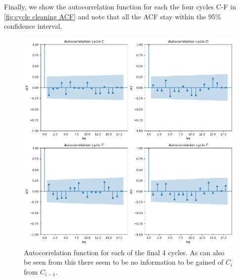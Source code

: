 \documentclass[../Thesis.tex]{subfiles}
\begin{document}
Finally, we show the autocorrelation function for each the four cycles C-F in \autoref{fig:cycle cleaning ACF} and note that all the ACF stay within the 95\% confidence interval.

\begin{figure}[h]
    \centering
    \includegraphics[width=0.8\linewidth]{figures/Multiple cycles data/Cleaning Autocorrelation.png}
    \caption{Autocorrelation function for each of the final 4 cycles. As can also be seen from this there seem to be no information to be gained of $C_i$ from $C_{i-1}$.}
    \label{fig:cycle cleaning ACF}
\end{figure}
\end{document}
